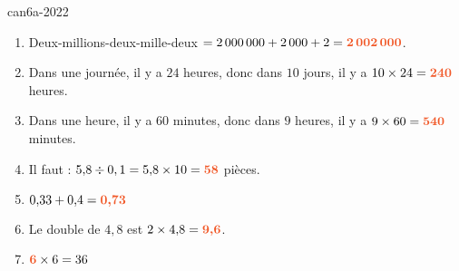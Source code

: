 \begin{EXO}{}{can6a-2022}
\begin{enumerate}[itemsep=1em, label=\arabic*)]
\item Deux-millions-deux-mille-deux $=2\,000\,000  + 2\,000 + 2={\color[HTML]{f15929}\boldsymbol{2\,002\,000}}$. 
\item Dans une journée, il y a $24$ heures, donc dans $10$ jours, il y a $10\times 24={\color[HTML]{f15929}\boldsymbol{240}}$ heures.
\item Dans une heure, il y a $60$ minutes, donc dans $9$ heures, il y a $9\times 60={\color[HTML]{f15929}\boldsymbol{540}}$ minutes.
\item Il faut : $5{,}8\div 0,1=5{,}8\times 10={\color[HTML]{f15929}\boldsymbol{58}}$ pièces.
\item  $0{,}33+0{,}4={\color[HTML]{f15929}\boldsymbol{0{,}73}}$
\item Le double de $4{,}8$ est $2\times 4{,}8={\color[HTML]{f15929}\boldsymbol{9{,}6}}$.
\item $ {\color[HTML]{f15929}\boldsymbol{6}} \times 6=36$
\end{enumerate}



\end{EXO}
\def\points{1}
\def\rdifficulty{2}

